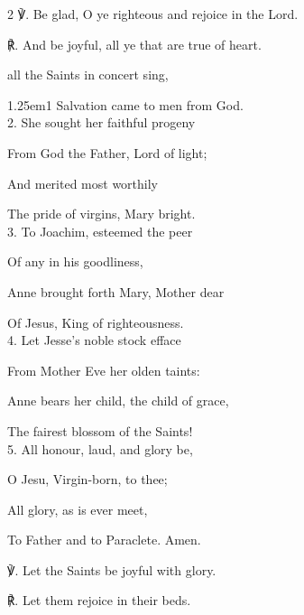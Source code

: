 \begin{paracol}{2}
℣. Be glad, O ye righteous and rejoice in the Lord.

℟. And be joyful, all ye that are true of heart.



\switchcolumn

\secondEvensong
{}

\secondEvensongHymn
{} all the Saints in concert sing,



\begin{hangparas}{1.25em}{1}
Salvation came to men from God.\\

2. She sought her faithful progeny

From God the Father, Lord of light;

And merited most worthily

The pride of virgins, Mary bright.\\

3. To Joachim, esteemed the peer

Of any in his goodliness,

Anne brought forth Mary, Mother dear

Of Jesus, King of righteousness.\\

4. Let Jesse's noble stock efface

From Mother Eve her olden taints:

Anne bears her child, the child of grace,

The fairest blossom of the Saints!\\

5. All honour, laud, and glory be,

O Jesu, Virgin-born, to thee;

All glory, as is ever meet,

To Father and to Paraclete. Amen.\\
\end{hangparas}

℣. Let the Saints be joyful with glory.

℟. Let them rejoice in their beds.


\fussy	
\end{paracol}

